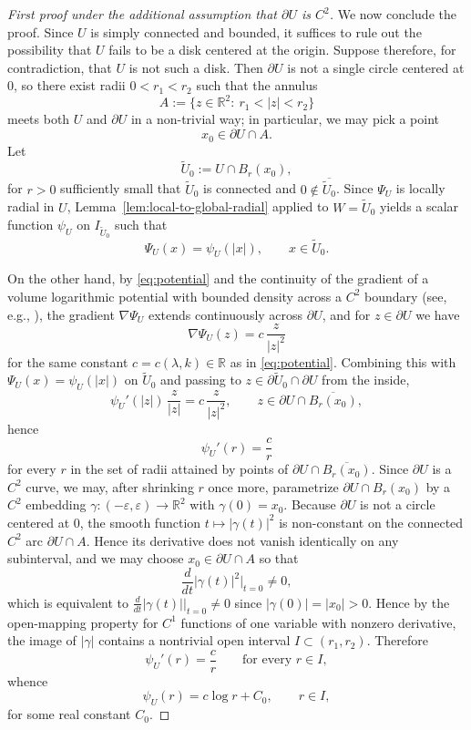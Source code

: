 \documentclass[a4paper,11pt,reqno]{amsart}
\numberwithin{equation}{section}
\theoremstyle{plain} %
\theoremstyle{definition} %
\theoremstyle{remark}
\newcommand{\R}{\mathbb{R}}
\begin{document}
\begin{proof}[First proof under the additional assumption that $\partial U$ is $C^2$]
We now conclude the proof. Since \(U\) is simply connected and bounded,
it suffices to rule out the possibility that \(U\) fails to be a disk
centered at the origin. Suppose therefore, for contradiction, that
\(U\) is not such a disk. Then \(\partial U\) is not a single circle
centered at $0$, so there exist radii \(0<r_1<r_2\) such that the
annulus
\[
A:=\{z\in \R^2:\ r_1<|z|<r_2\}
\]
meets both $U$ and $\partial U$ in a non-trivial way; in particular,
we may pick a point
\[
x_0\in \partial U\cap A.
\]
Let
\[
\widetilde{U}_0:=U\cap B_r(x_0),
\]
for $r>0$ sufficiently small that $\widetilde U_0$ is connected and
$0\notin \overline{\widetilde U_0}$. Since \(\Psi_U\) is locally radial
in \(U\), Lemma~\ref{lem:local-to-global-radial} applied to
$W=\widetilde U_0$ yields a scalar function \(\psi_U\) on
$I_{\widetilde U_0}$ such that
\[
\Psi_U(x)=\psi_U(|x|),\qquad x\in \widetilde{U}_0.
\]

On the other hand, by \eqref{eq:potential} and the continuity of the
gradient of a volume logarithmic potential with bounded density across
a $C^2$ boundary (see, e.g., \cite{Gustafsson,Isakov}), the gradient
$\nabla\Psi_U$ extends continuously across $\partial U$, and for
$z\in\partial U$ we have
\[
\nabla \Psi_U(z)=c\,\frac{z}{|z|^2}
\]
for the same constant $c=c(\lambda,k)\in \R$ as in
\eqref{eq:potential}. Combining this with $\Psi_U(x)=\psi_U(|x|)$ on
$\widetilde U_0$ and passing to $z\in \partial \widetilde U_0\cap
\partial U$ from the inside,
\[
\psi_U'(|z|)\,\frac{z}{|z|}=c\,\frac{z}{|z|^2},
\qquad z\in \partial U\cap \overline{B_r(x_0)},
\]
hence
\[
\psi_U'(r)=\frac{c}{r}
\]
for every $r$ in the set of radii attained by points of
$\partial U\cap \overline{B_r(x_0)}$. Since $\partial U$ is a $C^2$
curve, we may, after shrinking $r$ once more, parametrize
$\partial U\cap B_r(x_0)$ by a $C^2$ embedding
$\gamma:(-\varepsilon,\varepsilon)\to \R^2$ with $\gamma(0)=x_0$.
Because $\partial U$ is not a circle centered at $0$, the smooth
function $t\mapsto |\gamma(t)|^2$ is non-constant on the connected
$C^2$ arc $\partial U\cap A$. Hence its derivative does not vanish
identically on any subinterval, and we may choose $x_0\in\partial U\cap A$
so that
\[
\frac{d}{dt}|\gamma(t)|^2\Big|_{t=0}\ne 0,
\]
which is equivalent to $\frac{d}{dt}|\gamma(t)|\big|_{t=0}\ne 0$ since
$|\gamma(0)|=|x_0|>0$. Hence by the open-mapping
property for $C^1$ functions of one variable with nonzero derivative,
the image of $|\gamma|$ contains a nontrivial open interval
\(I\subset (r_1,r_2)\).
Therefore
\[
\psi_U'(r)=\frac{c}{r}
\qquad\text{for every }r\in I,
\]
whence
\[
\psi_U(r)=c\log r+C_0,
\qquad r\in I,
\]
for some real constant $C_0$.


\end{proof}
\end{document}
